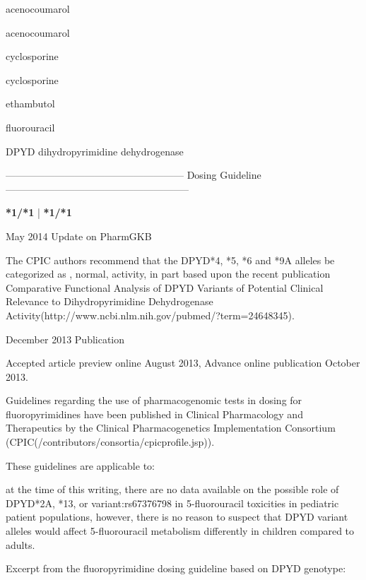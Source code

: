 \documentclass{resume} %
\begin{document}
\begin{rSection}{ acenocoumarol }
\begin{rSection}{ acenocoumarol }
\begin{rSection}{ cyclosporine }
\begin{rSection}{ cyclosporine }
\begin{rSection}{ ethambutol }
\end{rSection}
\begin{rSection}{ fluorouracil }
\item[]
\begin{rSubsection}{ DPYD }{ dihydropyrimidine dehydrogenase }{}{}
\item[]
\item[] ------------------------------------------------------ Dosing Guideline --------------------------------------------------------\newline
\item[]
\item[] \textbf{ *1/*1 } | \textbf{ *1/*1 }
\item May 2014 Update on PharmGKB
 \newline
\item The CPIC authors recommend that the DPYD*4, *5, *6 and *9A alleles be categorized as , normal,  activity, in part based upon the recent publication Comparative Functional Analysis of DPYD Variants of Potential Clinical Relevance to Dihydropyrimidine Dehydrogenase Activity(http://www.ncbi.nlm.nih.gov/pubmed/?term=24648345). 
 \newline
\item December 2013 Publication
 \newline
\item Accepted article preview online August 2013,  Advance online publication October 2013.
 \newline
\item Guidelines regarding the use of pharmacogenomic tests in dosing for fluoropyrimidines have been published in Clinical Pharmacology and Therapeutics by the Clinical Pharmacogenetics Implementation Consortium (CPIC(/contributors/consortia/cpicprofile.jsp)).
 \newline
\item These guidelines are applicable to:
 \newline
\item at the time of this writing, there are no data available on the possible role of DPYD*2A, *13, or variant:rs67376798 in 5-fluorouracil toxicities in pediatric patient populations,  however, there is no reason to suspect that DPYD variant alleles would affect 5-fluorouracil metabolism differently in children compared to adults.
 \newline
\item Excerpt from the fluoropyrimidine dosing guideline based on DPYD genotype:
 \newline

\end{rSubsection}
\end{rSection}
\end{rSection}
\end{rSection}
\end{rSection}
\end{rSection}
\end{document}
